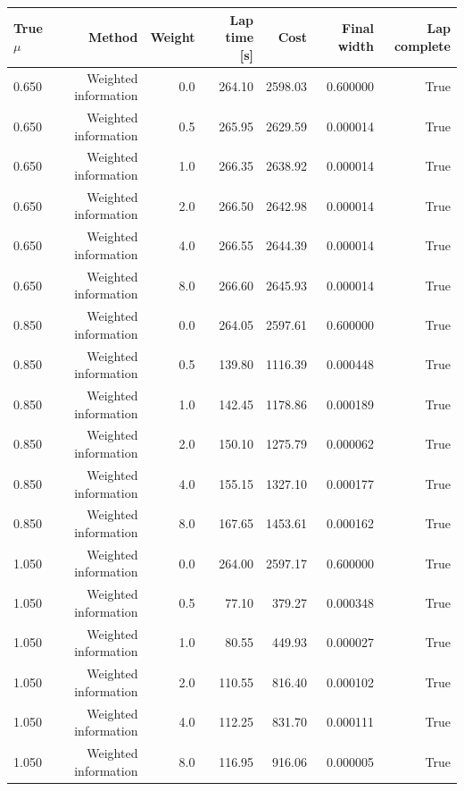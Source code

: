 \begin{tabular}{lrrrrrr}
\toprule
True $\mu$ & Method & Weight & Lap time [s] & Cost & Final width & Lap complete \\
\midrule
0.650 & Weighted information & 0.0 & 264.10 & 2598.03 & 0.600000 & True \\
0.650 & Weighted information & 0.5 & 265.95 & 2629.59 & 0.000014 & True \\
0.650 & Weighted information & 1.0 & 266.35 & 2638.92 & 0.000014 & True \\
0.650 & Weighted information & 2.0 & 266.50 & 2642.98 & 0.000014 & True \\
0.650 & Weighted information & 4.0 & 266.55 & 2644.39 & 0.000014 & True \\
0.650 & Weighted information & 8.0 & 266.60 & 2645.93 & 0.000014 & True \\
0.850 & Weighted information & 0.0 & 264.05 & 2597.61 & 0.600000 & True \\
0.850 & Weighted information & 0.5 & 139.80 & 1116.39 & 0.000448 & True \\
0.850 & Weighted information & 1.0 & 142.45 & 1178.86 & 0.000189 & True \\
0.850 & Weighted information & 2.0 & 150.10 & 1275.79 & 0.000062 & True \\
0.850 & Weighted information & 4.0 & 155.15 & 1327.10 & 0.000177 & True \\
0.850 & Weighted information & 8.0 & 167.65 & 1453.61 & 0.000162 & True \\
1.050 & Weighted information & 0.0 & 264.00 & 2597.17 & 0.600000 & True \\
1.050 & Weighted information & 0.5 & 77.10 & 379.27 & 0.000348 & True \\
1.050 & Weighted information & 1.0 & 80.55 & 449.93 & 0.000027 & True \\
1.050 & Weighted information & 2.0 & 110.55 & 816.40 & 0.000102 & True \\
1.050 & Weighted information & 4.0 & 112.25 & 831.70 & 0.000111 & True \\
1.050 & Weighted information & 8.0 & 116.95 & 916.06 & 0.000005 & True \\
\bottomrule
\end{tabular}
